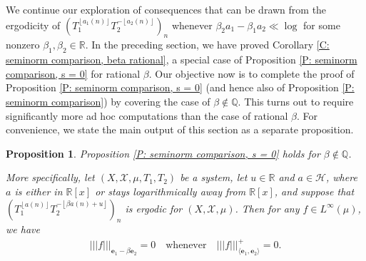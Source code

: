 \documentclass[11pt]{amsart}
\newtheorem{proposition}[lemma]{Proposition}
\theoremstyle{definition}
\newcommand{\Q}{{\mathbb Q}}
\newcommand{\R}{{\mathbb R}}
\newcommand{\CH}{{\mathcal H}}
\newcommand{\CX}{{\mathcal X}}
\newcommand{\be}{{\mathbf{e}}}
\newcommand{\nnorm}[1]{\lvert\!|\!| #1|\!|\!\rvert}
\newcommand{\1}{{\mathbf{1}}}
\newcommand{\floor}[1]{{\left \lfloor #1 \right \rfloor}}
\begin{document}
We continue our exploration of consequences that can be drawn from the ergodicity of $(T_1^{\floor{a_1(n)}}T_2^{-\floor{a_2(n)}})_n$ whenever $\beta_2 a_1 -\beta_1 a_2\ll \log$ for some nonzero $\beta_1,\beta_2\in\R$. 
In the preceding section, we have proved Corollary \ref{C: seminorm comparison, beta rational}, a special case of Proposition \ref{P: seminorm comparison, s = 0} for rational $\beta$. Our objective now is to complete the proof of Proposition \ref{P: seminorm comparison, s = 0} (and hence also of Proposition \ref{P: seminorm comparison}) by covering the case of $\beta\notin\Q$. This turns out to require significantly more ad hoc computations than the case of rational $\beta$. For convenience, we state the main output of this section as a separate proposition.

\begin{proposition}\label{P: beta irrational}
    Proposition \ref{P: seminorm comparison, s = 0} holds for $\beta\notin\Q$. 
    
    More specifically, let $(X, \CX, \mu, T_1, T_2)$ be a system, let $u\in\R$ and $a\in\CH$, where $a$ is either in $\R[x]$ or stays logarithmically away from $\R[x]$, and suppose that $(T_1^{\floor{a(n)}}T_2^{-\floor{\beta a(n)+u}})_n$ is ergodic for $(X, \CX, \mu)$. Then for any $f\in L^\infty(\mu)$, we have
    \begin{align*}
        \nnorm{f}_{\be_1 - \beta \be_2} = 0 \quad \textrm{whenever} \quad \nnorm{f}_{\langle\be_1, \be_2\rangle}^+ = 0.
    \end{align*}
\end{proposition}
\end{document}
